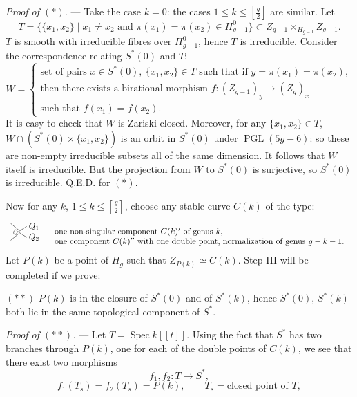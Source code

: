 \documentclass[10pt]{article}
\newcommand{\Spec}{\operatorname{Spec}}
\newcommand{\PGL}{\operatorname{PGL}}
\begin{document}
\noindent\emph{Proof of $(*)$.} --- Take the case $k=0$: the cases $1\leq k\leq\left[\frac g2\right]$ are similar. Let
\[
T=\{\{x_1,x_2\}\mid x_1\ne x_2\text{ and }\pi(x_1)=\pi(x_2)\in H^0_{g-1}\}\subset Z_{g-1}\times_{H_{g-1}}Z_{g-1}.
\]
$T$ is smooth with irreducible fibres over $H^0_{g-1}$, hence $T$ is irreducible. Consider the correspondence relating $S^*(0)$ and $T$:
\[
W=\left\{\begin{array}{l}
\text{set of pairs }x\in S^*(0),\ \{x_1,x_2\}\in T\text{ such that if }y=\pi(x_1)=\pi(x_2),\\
\text{then there exists a birational morphism } f:(Z_{g-1})_y\to (Z_g)_x\\
\text{such that }f(x_1)=f(x_2).
\end{array}\right.
\]
It is easy to check that $W$ is Zariski-closed. Moreover, for any $\{x_1,x_2\}\in T$, $W\cap(S^*(0)\times\{x_1,x_2\})$ is an orbit in $S^*(0)$ under $\PGL(5g-6)$: so these are non-empty irreducible subsets all of the same dimension. It follows that $W$ itself is irreducible. But the projection from $W$ to $S^*(0)$ is surjective, so $S^*(0)$ is irreducible. Q.E.D. for $(*)$.

Now for any $k$, $1\leq k\leq\left[\frac g2\right]$, choose any stable curve $C(k)$ of the type:
\[
\begin{array}{cl}
\begin{tikzpicture}[scale=.42,baseline=-2ex,line width=.45pt]
\draw (-.8,.85)--(.1,.1);
\draw (-.8,-.85)--(.1,-.1);
\draw (.1,.1)--(.8,.55);
\draw (.1,-.1)--(.8,-.55);
\draw (-.28,.23).. controls (-.65,.05) and (-.57,-.4)..(-.12,-.23);
\draw (-.25,.2)--(-.05,-.05);
\draw (-.25,-.2)--(-.05,.05);
\node[right] at (.72,.54) {$Q_1$};
\node[right] at (.72,-.54) {$Q_2$};
\end{tikzpicture}
&\begin{array}{l}
\text{one non-singular component }C(k)'\text{ of genus }k,\\
\text{one component }C(k)''\text{ with one double point, normalization of genus }g-k-1.
\end{array}
\end{array}
\]
Let $P(k)$ be a point of $H_g$ such that $Z_{P(k)}\simeq C(k)$. Step III will be completed if we prove:

\medskip
\noindent$(**)$ $P(k)$ is in the closure of $S^*(0)$ and of $S^*(k)$, hence $S^*(0)$, $S^*(k)$ both lie in the same topological component of $S^*$.

\noindent\emph{Proof of $(**)$.} --- Let $T=\Spec k[[t]]$. Using the fact that $S^*$ has two branches through $P(k)$, one for each of the double points of $C(k)$, we see that there exist two morphisms
\[
f_1,f_2:T\to S^*,
\]
\[
f_1(T_s)=f_2(T_s)=P(k),\qquad T_s=\text{closed point of }T,
\]
\end{document}
